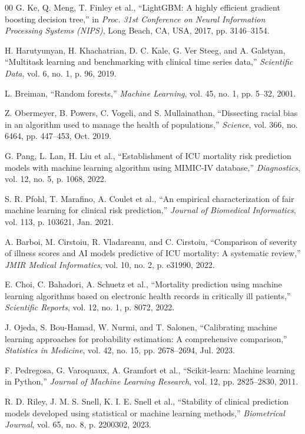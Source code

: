 \documentclass{ieeeaccess}
\begin{document}
\begin{thebibliography}{00}
 G. Ke, Q. Meng, T. Finley et al., ``LightGBM: A highly efficient gradient boosting decision tree,'' in \emph{Proc. 31st Conference on Neural Information Processing Systems (NIPS)}, Long Beach, CA, USA, 2017, pp. 3146--3154.

 H. Harutyunyan, H. Khachatrian, D. C. Kale, G. Ver Steeg, and A. Galstyan, ``Multitask learning and benchmarking with clinical time series data,'' \emph{Scientific Data}, vol. 6, no. 1, p. 96, 2019.

 L. Breiman, ``Random forests,'' \emph{Machine Learning}, vol. 45, no. 1, pp. 5--32, 2001.

 Z. Obermeyer, B. Powers, C. Vogeli, and S. Mullainathan, ``Dissecting racial bias in an algorithm used to manage the health of populations,'' \emph{Science}, vol. 366, no. 6464, pp. 447--453, Oct. 2019.

 G. Pang, L. Lan, H. Liu et al., ``Establishment of ICU mortality risk prediction models with machine learning algorithm using MIMIC-IV database,'' \emph{Diagnostics}, vol. 12, no. 5, p. 1068, 2022.

 S. R. Pfohl, T. Marafino, A. Coulet et al., ``An empirical characterization of fair machine learning for clinical risk prediction,'' \emph{Journal of Biomedical Informatics}, vol. 113, p. 103621, Jan. 2021.

 A. Barboi, M. Cirstoiu, R. Vladareanu, and C. Cirstoiu, ``Comparison of severity of illness scores and AI models predictive of ICU mortality: A systematic review,'' \emph{JMIR Medical Informatics}, vol. 10, no. 2, p. e31990, 2022.

 E. Choi, C. Bahadori, A. Schuetz et al., ``Mortality prediction using machine learning algorithms based on electronic health records in critically ill patients,'' \emph{Scientific Reports}, vol. 12, no. 1, p. 8072, 2022.

 J. Ojeda, S. Bou-Hamad, W. Nurmi, and T. Salonen, ``Calibrating machine learning approaches for probability estimation: A comprehensive comparison,'' \emph{Statistics in Medicine}, vol. 42, no. 15, pp. 2678--2694, Jul. 2023.

 F. Pedregosa, G. Varoquaux, A. Gramfort et al., ``Scikit-learn: Machine learning in Python,'' \emph{Journal of Machine Learning Research}, vol. 12, pp. 2825--2830, 2011.

 R. D. Riley, J. M. S. Snell, K. I. E. Snell et al., ``Stability of clinical prediction models developed using statistical or machine learning methods,'' \emph{Biometrical Journal}, vol. 65, no. 8, p. 2200302, 2023.

\end{thebibliography}
\end{document}
